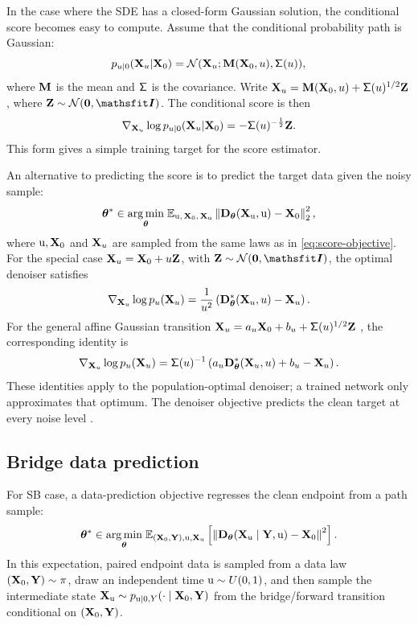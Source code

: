 In the case where the \ac{SDE} has a closed-form Gaussian solution, the conditional score becomes easy to compute. Assume that the conditional probability path is Gaussian:
\[
p_{u|0}({\mathbf{X}}_u|{\mathbf{X}}_0) = {\mathcal{N}}({\mathbf{X}}_u;{\mathbf{M}}({\mathbf{X}}_0,u),\mathsf\Sigma(u)),
\]
where ${\mathbf{M}}$ is the mean and ${\mathsf\Sigma}$ is the covariance. Write
${\mathbf{X}}_u={\mathbf{M}}({\mathbf{X}}_0,u)+{\mathsf\Sigma}(u)^{1/2}{\mathbf{Z}}$, where $\rmZ\sim\gN(\bm0,\tI)$. The conditional score is then
\[
\nabla_{{\mathbf{X}}_u}\log p_{u|0}({\mathbf{X}}_u|{\mathbf{X}}_0) = -{\mathsf\Sigma}(u)^{-\frac{1}{2}}{\mathbf{Z}}.
\]
This form gives a simple training target for the score estimator.

An alternative to predicting the score is to predict the target data given the noisy sample:
\[
{\bm{\theta}}^\ast\in\underset{{\bm{\theta}}}{\arg\min}\;\mathbb{E}_{{\textnormal{u}},\,{\mathbf{X}}_0,\,{\mathbf{X}}_{\textnormal{u}}}\left\lVert{\mathbf{D}}_{\bm{\theta}}({\mathbf{X}}_{\textnormal{u}},{\textnormal{u}})-{\mathbf{X}}_0\right\rVert_2^2,
\]
where ${\textnormal{u}},{\mathbf{X}}_0$ and ${\mathbf{X}}_u$ are sampled from the same laws as in \eqref{eq:score-objective}.
For the special case ${\mathbf{X}}_u={\mathbf{X}}_0+u{\mathbf{Z}}$, with $\rmZ\sim\gN(\bm0,\tI)$, the optimal denoiser satisfies
\[
\nabla_{{\mathbf{X}}_u}\log p_u({\mathbf{X}}_u)=\frac{1}{u^2}\left({\mathbf{D}}^*_{\bm{\theta}}({\mathbf{X}}_u,u)-{\mathbf{X}}_u\right).
\]
For the general affine Gaussian transition ${\mathbf{X}}_u=a_u{\mathbf{X}}_0+b_u+{\mathsf\Sigma}(u)^{1/2}{\mathbf{Z}}$ , the corresponding identity is
\[
\nabla_{{\mathbf{X}}_u}\log p_u({\mathbf{X}}_u)={\mathsf\Sigma}(u)^{-1}\left(a_u{\mathbf{D}}^*_{\bm{\theta}}({\mathbf{X}}_u,u)+b_u-{\mathbf{X}}_u\right).
\]
These identities apply to the population-optimal denoiser; a trained network only approximates that optimum. The denoiser objective predicts the clean target at every noise level \citep{karras2022elucidating}.




\subsection{Bridge data prediction}
For \ac{SB} case, a data-prediction objective regresses the clean endpoint from a path sample:
\[
{\bm{\theta}}^\ast\in\underset{{\bm{\theta}}}{\arg\min}\;\mathbb E_{({\mathbf{X}}_0,{\mathbf{Y}}),{\textnormal{u}},{\mathbf{X}}_{\textnormal{u}}}\left[\left\|{\mathbf{D}}_{\bm{\theta}}({\mathbf{X}}_{\textnormal{u}}\mid{\mathbf{Y}},{\textnormal{u}})-{\mathbf{X}}_0\right\|^2\right].
\]
In this expectation, paired endpoint data is sampled from a data law $({\mathbf{X}}_0,{\mathbf{Y}})\sim\pi$, draw an independent time ${\textnormal{u}}\sim U(0,1)$, and then sample the intermediate state ${\mathbf{X}}_{\textnormal{u}}\sim p_{{\textnormal{u}}\mid 0,Y}(\cdot\mid{\mathbf{X}}_0,{\mathbf{Y}})$ from the bridge/forward transition conditional on $({\mathbf{X}}_0,{\mathbf{Y}})$.


